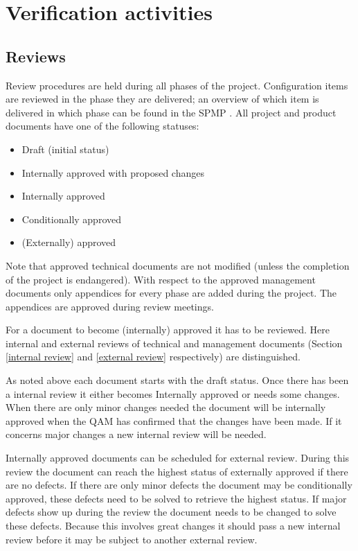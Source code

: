 \chapter{Verification activities} \label{verificationactivities}
\section{Reviews}
    Review procedures are held during all phases of the \projectname{} project. Configuration items are reviewed in the phase they are delivered; an overview of which item is delivered in which phase can be found in the SPMP \cite{spmp}. All project and product documents have one of the following statuses:
\begin{itemize}
\item Draft (initial status)
\item Internally approved with proposed changes
\item Internally approved
\item Conditionally approved
\item (Externally) approved
\end{itemize}
Note that approved technical documents are not modified (unless the completion of the project is endangered). With respect to the approved management documents only appendices for every phase are added during the project. The appendices are approved during review meetings.

For a document to become (internally) approved it has to be reviewed. Here internal and external reviews of technical and management documents (Section \ref{internal review} and \ref{external review} respectively) are distinguished.

As noted above each document starts with the draft status. Once there has been a internal review it either becomes Internally approved or needs some changes. When there are only minor changes needed the document will be internally approved when the QAM has confirmed that the changes have been made. If it concerns major changes a new internal review will be needed.

Internally approved documents can be scheduled for external review. During this review the document can reach the highest status of externally approved if there are no defects. If there are only minor defects the document may be conditionally approved, these defects need to be solved to retrieve the highest status. If major defects show up during the review the document needs to be changed to solve these defects. Because this involves great changes it should pass a new internal review before it may be subject to another external review.

